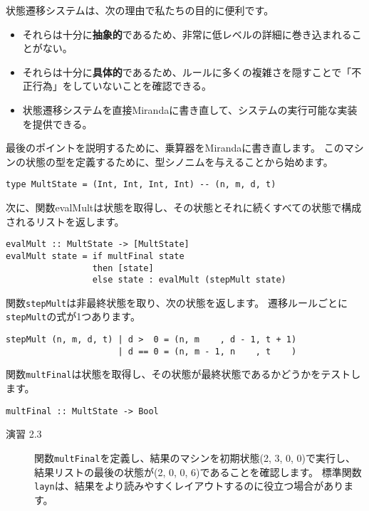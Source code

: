 \documentclass{jarticle}
\begin{document}
状態遷移システムは、次の理由で私たちの目的に便利です。

\begin{itemize}
	\item それらは十分に\textbf{抽象的}であるため、非常に低レベルの詳細に巻き込まれることがない。
	\item それらは十分に\textbf{具体的}であるため、ルールに多くの複雑さを隠すことで「不正行為」をしていないことを確認できる。
	\item 状態遷移システムを直接Mirandaに書き直して、システムの実行可能な実装を提供できる。
\end{itemize}

最後のポイントを説明するために、乗算器をMirandaに書き直します。
このマシンの状態の型を定義するために、型シノニムを与えることから始めます。

\begin{verbatim}
type MultState = (Int, Int, Int, Int) -- (n, m, d, t)
\end{verbatim}

次に、関数evalMultは状態を取得し、その状態とそれに続くすべての状態で構成されるリストを返します。

\begin{verbatim}
evalMult :: MultState -> [MultState]
evalMult state = if multFinal state
                 then [state]
                 else state : evalMult (stepMult state)
\end{verbatim}

関数\texttt{stepMult}は非最終状態を取り、次の状態を返します。
遷移ルールごとに\texttt{stepMult}の式が1つあります。

\begin{verbatim}
stepMult (n, m, d, t) | d >  0 = (n, m    , d - 1, t + 1)
                      | d == 0 = (n, m - 1, n    , t    )
\end{verbatim}

関数\texttt{multFinal}は状態を取得し、その状態が最終状態であるかどうかをテストします。

\begin{verbatim}
multFinal :: MultState -> Bool
\end{verbatim}

\begin{description}
	\item[演習 2.3] 関数\texttt{multFinal}を定義し、結果のマシンを初期状態(2, 3, 0, 0)で実行し、結果リストの最後の状態が(2, 0, 0, 6)であることを確認します。
	      標準関数\texttt{layn}は、結果をより読みやすくレイアウトするのに役立つ場合があります。
\end{description}
\end{document}
